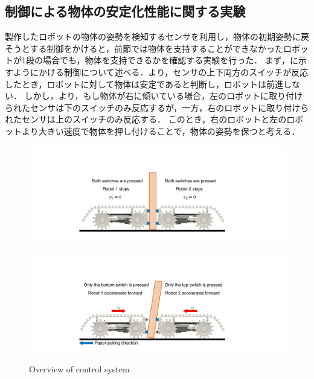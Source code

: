 \subsection{制御による物体の安定化性能に関する実験}
製作したロボットの物体の姿勢を検知するセンサを利用し，物体の初期姿勢に戻そうとする制御をかけると，前節では物体を支持することができなかったロボットが1段の場合でも，物体を支持できるかを確認する実験を行った．
まず，に示すようにかける制御について述べる．より，センサの上下両方のスイッチが反応したとき，ロボットに対して物体は安定であると判断し，ロボットは前進しない．
しかし，より，もし物体が右に傾いている場合，左のロボットに取り付けられたセンサは下のスイッチのみ反応するが，一方，右のロボットに取り付けられたセンサは上のスイッチのみ反応する．
このとき，右のロボットと左のロボットより大きい速度で物体を押し付けることで，物体の姿勢を保つと考える．
\begin{figure}[tb]
  \begin{minipage}[b]{0.5\columnwidth}
  \centering
  \includegraphics[width=\columnwidth]{figures/control-upright.pdf}
  \label{fig:upright}
 \end{minipage}%
 \begin{minipage}[b]{0.5\columnwidth}
  \centering
  \includegraphics[width=\columnwidth]{figures/control-tilted-v2.pdf}
  \label{fig:tilted}
 \end{minipage}
 \caption{Overview of control system}
 \label{fig:control-figure}
\end{figure}

